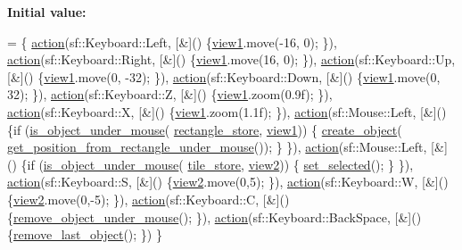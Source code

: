 {\bfseries Initial value\+:}
\begin{DoxyCode}
= \{
        \hyperlink{classaction}{action}(sf::Keyboard::Left,  [&]() \{\hyperlink{classleveleditor_a8a6367bede4a3a13c41f764f1ac628a4}{view1}.move(-16, 0); \}),
        \hyperlink{classaction}{action}(sf::Keyboard::Right, [&]() \{\hyperlink{classleveleditor_a8a6367bede4a3a13c41f764f1ac628a4}{view1}.move(16, 0); \}),
        \hyperlink{classaction}{action}(sf::Keyboard::Up,    [&]() \{\hyperlink{classleveleditor_a8a6367bede4a3a13c41f764f1ac628a4}{view1}.move(0, -32); \}),
        \hyperlink{classaction}{action}(sf::Keyboard::Down,  [&]() \{\hyperlink{classleveleditor_a8a6367bede4a3a13c41f764f1ac628a4}{view1}.move(0, 32); \}),
        \hyperlink{classaction}{action}(sf::Keyboard::Z,     [&]() \{\hyperlink{classleveleditor_a8a6367bede4a3a13c41f764f1ac628a4}{view1}.zoom(0.9f); \}),
        \hyperlink{classaction}{action}(sf::Keyboard::X,       [&]() \{\hyperlink{classleveleditor_a8a6367bede4a3a13c41f764f1ac628a4}{view1}.zoom(1.1f); \}),
        \hyperlink{classaction}{action}(sf::Mouse::Left,     [&]() \{\textcolor{keywordflow}{if} (\hyperlink{classleveleditor_a0c983ad2887a677d22fbea4eed0ec7d4}{is\_object\_under\_mouse}(
      \hyperlink{classleveleditor_a07af571a23c704edfe87baef71265597}{rectangle\_store}, \hyperlink{classleveleditor_a8a6367bede4a3a13c41f764f1ac628a4}{view1})) \{ \hyperlink{classleveleditor_a3d09ece44892be49f42c62b3cdcada0c}{create\_object}(
      \hyperlink{classleveleditor_ac6bf4571731b8283feb4c20d1391fa8b}{get\_position\_from\_rectangle\_under\_mouse}()); \} \}),
        \hyperlink{classaction}{action}(sf::Mouse::Left,       [&]() \{\textcolor{keywordflow}{if} (\hyperlink{classleveleditor_a0c983ad2887a677d22fbea4eed0ec7d4}{is\_object\_under\_mouse}(
      \hyperlink{classleveleditor_a0af5e07c57e50b3ad3d15d7ae64190ce}{tile\_store}, \hyperlink{classleveleditor_aa6730359d22f4ea8f82347e29af75afa}{view2})) \{ \hyperlink{classleveleditor_a6579d63ca18e84f7a335bf8072f798cc}{set\_selected}(); \} \}),
        \hyperlink{classaction}{action}(sf::Keyboard::S,       [&]() \{\hyperlink{classleveleditor_aa6730359d22f4ea8f82347e29af75afa}{view2}.move(0,5); \}),
        \hyperlink{classaction}{action}(sf::Keyboard::W,       [&]() \{\hyperlink{classleveleditor_aa6730359d22f4ea8f82347e29af75afa}{view2}.move(0,-5); \}),
        \hyperlink{classaction}{action}(sf::Keyboard::C,     [&]() \{\hyperlink{classleveleditor_a89e3b4fb65aa6db692a2f4db65e6dba2}{remove\_object\_under\_mouse}(); \}),
        \hyperlink{classaction}{action}(sf::Keyboard::BackSpace, [&]() \{\hyperlink{classleveleditor_aa2b54b93aa87f704d841f6ccd59b4e38}{remove\_last\_object}(); \})
    \}
\end{DoxyCode}


